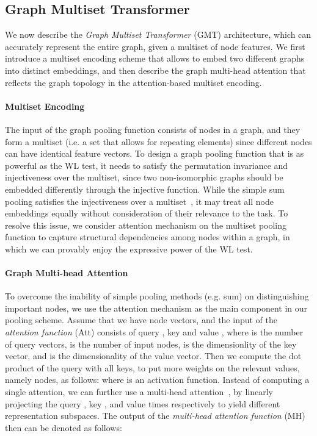 \documentclass{article} \usepackage{iclr2021_conference,times}
\begin{document}
\subsection{Graph Multiset Transformer}
We now describe the \emph{Graph Multiset Transformer} (GMT) architecture, which can accurately represent the entire graph, given a multiset of node features. We first introduce a multiset encoding scheme that allows to embed two different graphs into distinct embeddings, and then describe the graph multi-head attention that reflects the graph topology in the attention-based multiset encoding.

\paragraph{Multiset Encoding}
The input of the graph pooling function  consists of nodes in a graph, and they form a multiset (i.e. a set that allows for repeating elements) since different nodes can have identical feature vectors. To design a graph pooling function that is as powerful as the WL test, it needs to satisfy the permutation invariance and injectiveness over the multiset, since two non-isomorphic graphs should be embedded differently through the injective function. While the simple sum pooling satisfies the injectiveness over a multiset~\citep{GIN}, it may treat all node embeddings equally without consideration of their relevance to the task. To resolve this issue, we consider attention mechanism on the multiset pooling function to capture structural dependencies among nodes within a graph, in which we can provably enjoy the expressive power of the WL test.

\paragraph{Graph Multi-head Attention}
To overcome the inability of simple pooling methods (e.g. sum) on distinguishing important nodes, we use the attention mechanism as the main component in our pooling scheme. Assume that we have  node vectors, and the input of the \emph{attention function} (Att) consists of query , key  and value , where  is the number of query vectors,  is the number of input nodes,  is the dimensionlity of the key vector, and  is the dimensionality of the value vector. Then we compute the dot product of the query with all keys, to put more weights on the relevant values, namely nodes, as follows:  where  is an activation function. Instead of computing a single attention, we can further use a multi-head attention~\citep{Transformer}, by linearly projecting the query , key , and value   times respectively to yield  different representation subspaces. The output of the \emph{multi-head attention function} (MH) then can be denoted as follows:
\end{document}
